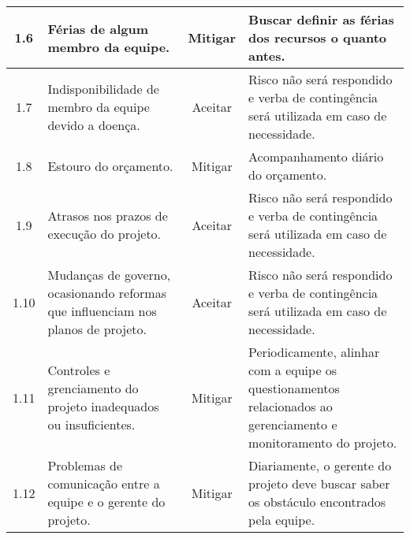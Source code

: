 \begin{longtable}{ c p{} c p{} }
	\midrule
	1.6                      & Férias de algum membro da equipe.                                                                                                                                            & Mitigar                    & Buscar definir as férias dos recursos o quanto antes.                                                                                 \\
	\midrule
	1.7                      & Indisponibilidade de membro da equipe devido a doença.                                                                                                                       & Aceitar                    & Risco não será respondido e verba de contingência será utilizada em caso de necessidade.                                           \\
	\midrule
	1.8                      & Estouro do orçamento.                                                                                                                                                        & Mitigar                    & Acompanhamento diário do orçamento.                                                                                                  \\
	\midrule
	1.9                      & Atrasos nos prazos de execução do projeto.                                                                                                                                  & Aceitar                    & Risco não será respondido e verba de contingência será utilizada em caso de necessidade.                                           \\
	\midrule
	1.10                     & Mudanças de governo, ocasionando reformas que influenciam nos planos de projeto.                                                                                             & Aceitar                    & Risco não será respondido e verba de contingência será utilizada em caso de necessidade.                                           \\
	\midrule
	1.11                     & Controles e grenciamento do projeto inadequados ou insuficientes.                                                                                                             & Mitigar                    & Periodicamente, alinhar com a equipe os questionamentos relacionados ao gerenciamento e monitoramento do projeto.                      \\
	\midrule
	1.12                     & Problemas de comunicação entre a equipe e o gerente do projeto.                                                                                                             & Mitigar                    & Diariamente, o gerente do projeto deve buscar saber os obstáculo encontrados pela equipe.                                             \\

\end{longtable}
